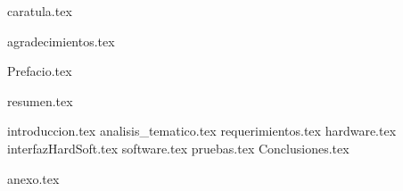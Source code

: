 \documentclass[a4paper,openany,12pt]{book}
\renewcommand{\headrulewidth}{0pt}%
\renewcommand{\headrulewidth}{0pt}
\renewcommand{\footrulewidth}{0pt}}
\begin{document}
{caratula.tex}
\clearpage
\newpage

\frontmatter
{agradecimientos.tex}
\clearpage
\newpage

{Prefacio.tex}
\clearpage
\newpage

{resumen.tex}
\clearpage

\newpage

\tableofcontents
\clearpage
\listoftables
\clearpage
\listoffigures
\clearpage

\newpage





\pagestyle{fancy}
\setlength{\headheight}{15pt}%

\lhead[]{}
\chead[]{}
\rhead[]{}
\cfoot[]{}
\fancyhead[LO,RE]{ \leftmark}%
\renewcommand{\headrulewidth}{0pt}%
\fancyfoot[LO,RE]{\thepage}%

\fancypagestyle{plain}{%
\fancyhf{} 
\fancyfoot[LO,RE]{\thepage}
\renewcommand{\headrulewidth}{0pt}
\renewcommand{\footrulewidth}{0pt}}


\mainmatter

{introduccion.tex}
\clearpage
{analisis_tematico.tex}
\clearpage
{requerimientos.tex}
\clearpage
{hardware.tex}
\clearpage
{interfazHardSoft.tex}
\clearpage
{software.tex}
\clearpage
{pruebas.tex}
\clearpage
{Conclusiones.tex}
\clearpage



\printglossary
\clearpage
{} %

\nocite{*}


\clearpage

{anexo.tex}
\end{document}
